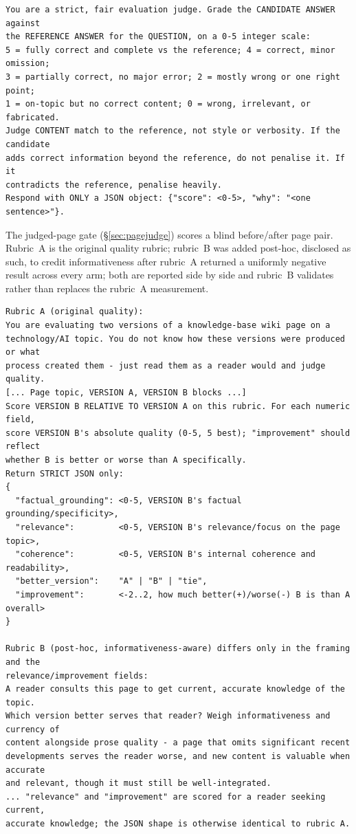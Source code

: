 \documentclass[10pt,twocolumn]{article}
\begin{document}
{\footnotesize\begin{verbatim}
You are a strict, fair evaluation judge. Grade the CANDIDATE ANSWER against
the REFERENCE ANSWER for the QUESTION, on a 0-5 integer scale:
5 = fully correct and complete vs the reference; 4 = correct, minor omission;
3 = partially correct, no major error; 2 = mostly wrong or one right point;
1 = on-topic but no correct content; 0 = wrong, irrelevant, or fabricated.
Judge CONTENT match to the reference, not style or verbosity. If the candidate
adds correct information beyond the reference, do not penalise it. If it
contradicts the reference, penalise heavily.
Respond with ONLY a JSON object: {"score": <0-5>, "why": "<one sentence>"}.
\end{verbatim}}

\noindent The judged-page gate (\S\ref{sec:pagejudge}) scores a blind before/after
page pair. Rubric~A is the original quality rubric; rubric~B was added post-hoc,
disclosed as such, to credit informativeness after rubric~A returned a uniformly
negative result across every arm; both are reported side by side and rubric~B
validates rather than replaces the rubric~A measurement.

{\footnotesize\begin{verbatim}
Rubric A (original quality):
You are evaluating two versions of a knowledge-base wiki page on a
technology/AI topic. You do not know how these versions were produced or what
process created them - just read them as a reader would and judge quality.
[... Page topic, VERSION A, VERSION B blocks ...]
Score VERSION B RELATIVE TO VERSION A on this rubric. For each numeric field,
score VERSION B's absolute quality (0-5, 5 best); "improvement" should reflect
whether B is better or worse than A specifically.
Return STRICT JSON only:
{
  "factual_grounding": <0-5, VERSION B's factual grounding/specificity>,
  "relevance":         <0-5, VERSION B's relevance/focus on the page topic>,
  "coherence":         <0-5, VERSION B's internal coherence and readability>,
  "better_version":    "A" | "B" | "tie",
  "improvement":       <-2..2, how much better(+)/worse(-) B is than A overall>
}

Rubric B (post-hoc, informativeness-aware) differs only in the framing and the
relevance/improvement fields:
A reader consults this page to get current, accurate knowledge of the topic.
Which version better serves that reader? Weigh informativeness and currency of
content alongside prose quality - a page that omits significant recent
developments serves the reader worse, and new content is valuable when accurate
and relevant, though it must still be well-integrated.
... "relevance" and "improvement" are scored for a reader seeking current,
accurate knowledge; the JSON shape is otherwise identical to rubric A.
\end{verbatim}}
\end{document}
